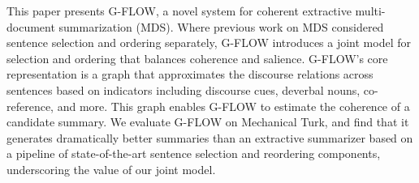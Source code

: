 This paper presents G-FLOW, a novel system for coherent extractive multi-document summarization (MDS). Where previous work on MDS considered
 sentence selection and ordering separately, G-FLOW introduces a joint model for
 selection and ordering that balances coherence and salience. G-FLOW's core
 representation is a graph that approximates the discourse relations across
 sentences based on indicators including discourse cues, deverbal nouns,
 co-reference, and more. This graph enables G-FLOW to estimate the coherence of
 a candidate summary.
 We evaluate G-FLOW on Mechanical Turk, and find that it generates dramatically
 better summaries than an extractive summarizer based on a pipeline of
 state-of-the-art sentence selection and reordering components, underscoring the
 value of our joint model.

